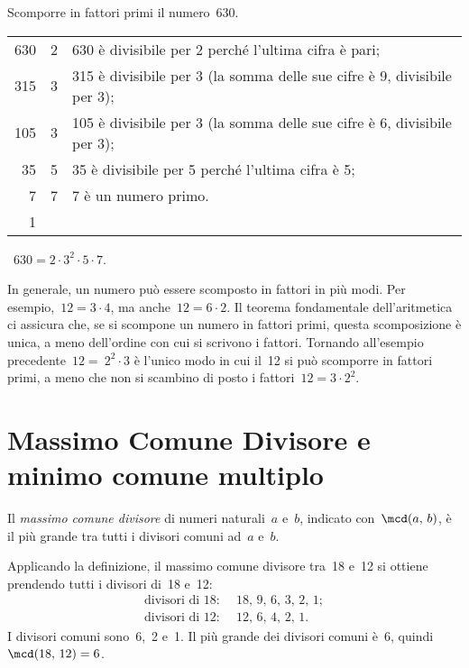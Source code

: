 \begin{exrig}
 \begin{esempio}
 Scomporre in fattori primi il numero~630.
 \begin{center}
% 
 \begin{tabular}{r|l@{\hspace{15mm}}l}
 	630 & 2 & 630 è divisibile per 2 perché l'ultima cifra è pari;\\
	315 & 3 & 315 è divisibile per 3 (la somma delle sue cifre è 9, divisibile per 3);\\
	105 & 3 & 105 è divisibile per 3 (la somma delle sue cifre è 6, divisibile per 3);\\
	35 & 5 & 35 è divisibile per 5 perché l'ultima cifra è 5;\\
	7 & 7 & 7 è un numero primo.\\
	1 & \\
 \end{tabular}
 ~$630=2\cdot3^2\cdot5\cdot7.$
 \end{center}
 \end{esempio}
\end{exrig}

In generale, un numero può essere scomposto in fattori in più modi. Per esempio,~$12=3\cdot 4$,
ma anche~$12=6\cdot2$. Il teorema fondamentale dell'aritmetica ci assicura che, se si scompone un numero in fattori primi,
questa scomposizione è unica, a meno dell'ordine con cui si scrivono i fattori. Tornando all'esempio
precedente~$12=~2^2\cdot 3$ è l'unico modo in cui il~12 si può scomporre in fattori primi, a meno che non si
scambino di posto i fattori~$12=3\cdot 2^2$.

\vspazio\ovalbox{\risolvii \ref{ese:1.19}, \ref{ese:1.20}}

\section{Massimo Comune Divisore e minimo comune multiplo}

\label{def:mcd}
\begin{definizione}
Il \emph{massimo comune divisore} di numeri naturali~$a$ e~$b$, indicato con~$\mcd(a\text{,~}b)$, è il
più grande tra tutti i divisori comuni ad~$a$ e~$b$.
\end{definizione}

Applicando la definizione, il massimo comune divisore tra~18 e~12 si ottiene prendendo tutti i divisori
di~18 e~12:
\begin{align*}
\text{divisori di }18: &\text{~}18\text{, }9\text{, }6\text{, }3\text{, }2\text{, }1;\\
\text{divisori di }12: &\text{~}12\text{, }6\text{, }4\text{, }2\text{, }1.
\end{align*}
I divisori comuni sono~6,~2 e~1. Il più grande dei divisori comuni è~6, quindi $\mcd(18\text{,~}12)=6$.

